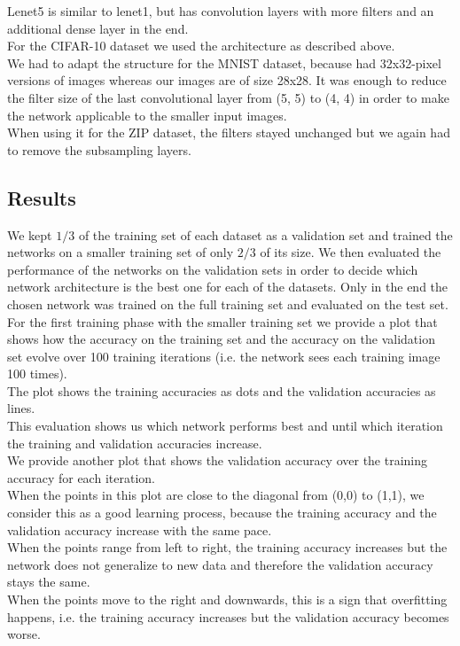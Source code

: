 Lenet5 is similar to lenet1, but has convolution layers with more filters
and an additional dense layer in the end.\\

For the CIFAR-10 dataset we used the architecture as described above.\\
We had to adapt the structure for the MNIST dataset,
because \cite{lecun98} had 32x32-pixel versions of images
whereas our images are of size 28x28.
It was enough to reduce the filter size
of the last convolutional layer from (5, 5) to (4, 4) in order
to make the network applicable to the smaller input images.\\
When using it for the ZIP dataset, the filters stayed unchanged
but we again had to remove the subsampling layers.\\


\subsection{Results}

We kept $1/3$ of the training set of each dataset as a validation set and trained the networks
on a smaller training set of only $2/3$ of its size.
We then evaluated the performance of the networks on the validation sets in order to decide
which network architecture is the best one for each of the datasets.
Only in the end the chosen network was trained on the full training set and evaluated on the test set.\\

For the first training phase with the smaller training set we provide a plot
that shows how the accuracy on the training set and the accuracy on the validation set evolve over
100 training iterations (i.e. the network sees each training image 100 times).\\
The plot shows the training accuracies as dots and the validation accuracies as lines.\\
This evaluation shows us which network performs best and until which iteration the training and validation accuracies
increase.\\

We provide another plot that shows the validation accuracy over the training accuracy for each iteration.\\
When the points in this plot are close to the diagonal from (0,0) to (1,1), we consider this as a good learning process,
because the training accuracy and the validation accuracy increase with the same pace.\\
When the points range from left to right, the training accuracy increases but the network does not generalize to new data
and therefore the validation accuracy stays the same.\\
When the points move to the right and downwards, this is a sign that overfitting happens,
i.e. the training accuracy increases but the validation accuracy becomes worse.


